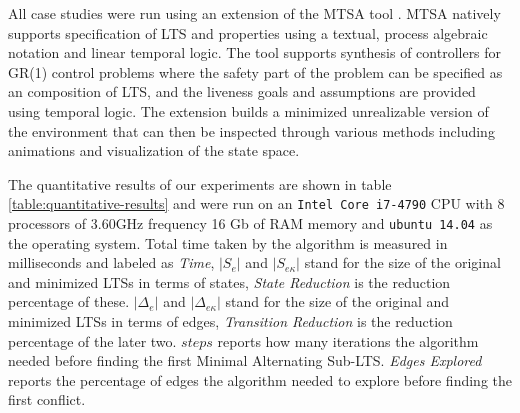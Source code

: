 All case studies were run using an extension of the MTSA tool \cite{DBLP:conf/kbse/DIppolitoFCU08}. MTSA natively supports specification of LTS \cite{DBLP:journals/cacm/Keller76} and properties using
 a textual, process algebraic notation and linear temporal logic.  The tool supports synthesis of controllers for GR(1) control problems where the safety part of the problem can be specified as an composition of LTS, and the liveness goals and assumptions are provided using temporal logic.   
  The extension builds a minimized unrealizable version of the environment that can then be inspected through various methods including animations and visualization of the state space.
  


  
  
The quantitative results of our experiments are shown in table 
\ref{table:quantitative-results} and were run on an 
\texttt{Intel\textsuperscript{\textregistered} Core\textsuperscript{\texttrademark}
 i7-4790} CPU with 8 processors of 3.60GHz frequency
16 Gb of RAM memory and \texttt{ubuntu 14.04} as the operating system.
Total time taken by the algorithm is measured in milliseconds and
labeled as \emph{Time}, $|S_e|$ and $|S_{e\kappa}|$ stand for
the size of the original and minimized LTSs in terms of states,
\emph{State Reduction} is the reduction percentage of these.  
$|\Delta_e|$ and $|\Delta_{e\kappa}|$ stand for
the size of the original and minimized LTSs in terms of edges,
\emph{Transition Reduction} is the reduction percentage of the later two.  
$steps$ reports how many iterations the algorithm needed before finding
the first Minimal Alternating Sub-LTS. \emph{Edges Explored} reports the percentage of
edges the algorithm needed to explore before finding the first
conflict.
 
